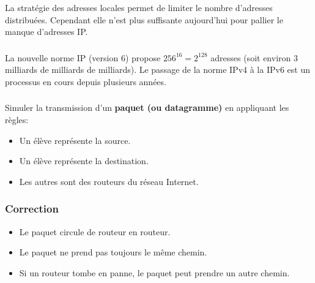 \documentclass[svgnames,11pt]{beamer}
\begin{document}
\begin{frame}
    \frametitle{}

    \begin{aretenir}[]
    La stratégie des adresses locales permet de limiter le nombre d'adresses distribuées. Cependant elle n'est plus suffisante aujourd'hui pour pallier le manque d'adresses IP.
    \end{aretenir}
\end{frame}
\begin{frame}
    \frametitle{}

    \begin{aretenir}[]
    La nouvelle norme IP (version 6) propose $256^{16}=2^{128}$ adresses (soit environ 3 milliards de milliards de milliards). Le passage de la norme IPv4 à la IPv6 est un processus en cours depuis plusieurs années.
    \end{aretenir}

\end{frame}
\begin{frame}
    \frametitle{}

    \begin{activite}
    Simuler la transmission d'un \textbf{paquet (ou datagramme)} en appliquant les règles:
    \begin{itemize}
        \item Un élève représente la source.
        \item Un élève représente la destination.
        \item Les autres sont des routeurs du réseau Internet.
    \end{itemize}
    \end{activite}

\end{frame}
\begin{frame}
    \frametitle{Correction}

    \begin{itemize}
        \item Le paquet circule de routeur en routeur.
        \item Le paquet ne prend pas toujours le même chemin.
        \item Si un routeur tombe en panne, le paquet peut prendre un autre chemin.
    \end{itemize}

\end{frame}
\end{document}
